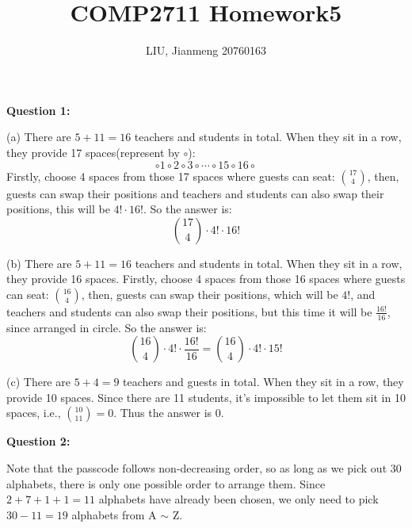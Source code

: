 \documentclass[a4paper,11pt]{article}
\title{\textbf{COMP2711} Homework5}
\author{LIU, Jianmeng 20760163}
\date{}
\begin{document}
    \maketitle

    \begin{spacing}{1.4}

    \setlength{\parindent}{0em}

    \textbf{Question 1:}

    (a) There are $5+11=16$ teachers and students in total. When they
    sit in a row, they provide 17 spaces(represent by $\circ$):
    $$\circ 1 \circ 2 \circ 3 \circ \cdots \circ 15 \circ 16 \circ$$
    Firstly, choose 4 spaces from those 17 spaces where guests can seat:
    ${17\choose 4}$, then, guests can swap their positions and teachers and
    students can also swap their positions, this will be $4!\cdot 16!$.
    So the answer is:
    $${17\choose 4}\cdot 4!\cdot 16!$$

    \vspace{5pt}

    (b) There are $5+11=16$ teachers and students in total. When they
    sit in a row, they provide 16 spaces. 
    Firstly, choose 4 spaces from those 16 spaces where guests can seat:
    ${16\choose 4}$, then, guests can swap their positions, which will 
    be $4!$, and teachers and students can also swap their positions, 
    but this time it will be $\frac{16!}{16}$, since arranged in circle.
    So the answer is:
    $${16\choose 4}\cdot 4!\cdot \frac{16!}{16}={16\choose 4}\cdot 4!\cdot 15!$$

    \vspace{5pt}

    (c) There are $5+4=9$ teachers and guests in total. When they
    sit in a row, they provide 10 spaces. Since there are 11 students,
    it's impossible to let them sit in 10 spaces, i.e., 
    ${10\choose 11}=0$. Thus the answer is 0.

    
    \vspace{20pt}

    \textbf{Question 2:}

    \hspace{2em}
    Note that the passcode follows non-decreasing order, so as long as
    we pick out 30 alphabets, there is only one possible order
    to arrange them. Since $2+7+1+1=11$ alphabets have already been 
    chosen, we only need to pick $30-11=19$ alphabets from A $\sim $ Z.



\end{spacing}
\end{document}
